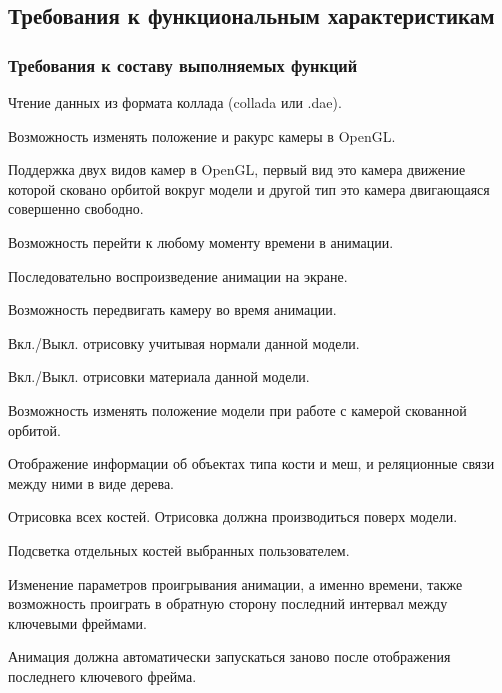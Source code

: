 

\subsection{Требования к функциональным характеристикам}
\subsubsection{Требования к составу выполняемых функций}
\begin{my_enumerate}
\item Чтение данных из формата коллада (collada или .dae).
\item Возможность изменять положение и ракурс камеры в OpenGL.
\item Поддержка двух видов камер в OpenGL, первый вид это камера движение которой сковано орбитой вокруг модели и другой тип это камера двигающаяся совершенно свободно.
\item Возможность перейти к любому моменту времени в анимации.
\item Последовательно воспроизведение анимации на экране.
\item Возможность передвигать камеру во время анимации.
\item Вкл./Выкл. отрисовку учитывая нормали данной модели.
\item Вкл./Выкл. отрисовки материала данной модели.
\item Возможность изменять положение модели при работе с камерой скованной орбитой.
\item Отображение информации об объектах типа кости и меш, и реляционные связи между ними в виде дерева.
\item Отрисовка всех костей. Отрисовка должна производиться поверх модели.
\item Подсветка отдельных костей выбранных пользователем.
\item Изменение параметров проигрывания анимации, а именно времени, также возможность проиграть в обратную сторону последний интервал между ключевыми фреймами.
\item Анимация должна автоматически запускаться заново после отображения последнего ключевого фрейма.
\end{my_enumerate}


